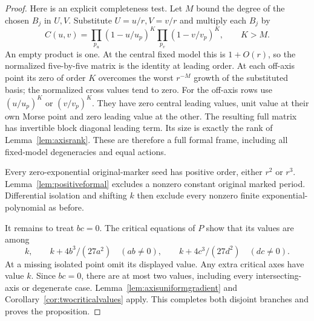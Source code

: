 \documentclass[11pt]{article}
\theoremstyle{definition}\newtheorem{definition}[theorem]{Definition}
\theoremstyle{remark}\newtheorem{remark}[theorem]{Remark}
\begin{document}
\begin{proof}
Here is an explicit completeness test. Let $M$ bound the degree
of the chosen $B_j$ in $U,V$. Substitute $U=u/r,V=v/r$ and
multiply each $B_j$ by
\[
 C(u,v)=\prod_{p_u}(1-u/u_p)^K
                      \prod_{p_v}(1-v/v_p)^K,\qquad K>M.
\]
An empty product is one. At the central fixed model this is
$1+O(r)$, so the normalized five-by-five matrix is the identity
at leading order. At each off-axis point its zero of order $K$
overcomes the worst $r^{-M}$ growth of the substituted basis;
the normalized cross values tend to zero. For the off-axis rows
use $(u/u_p)^K$ or $(v/v_p)^K$. They have zero central leading
values, unit value at their own Morse point and zero leading
value at the other. The resulting full matrix has invertible
block diagonal leading term. Its size is exactly the rank of
Lemma~\ref{lem:axisrank}. These are therefore a full formal
frame, including all fixed-model degeneracies and equal actions.

Every zero-exponential original-marker seed has positive order,
either $r^2$ or $r^3$. Lemma~\ref{lem:positiveformal} excludes
a nonzero constant original marked period. Differential
isolation and shifting $k$ then exclude every nonzero finite
exponential-polynomial as before.

It remains to treat $bc=0$. The critical equations of $P$ show
that its values are among
\[
 k,\qquad k+4b^3/(27a^2)\quad(ab\ne0),\qquad
 k+4c^3/(27d^2)\quad(dc\ne0).
\]
At a missing isolated point omit its displayed value. Any extra
critical axes have value $k$. Since $bc=0$, there are at most
two values, including every intersecting-axis or degenerate
case. Lemma~\ref{lem:axisuniformgradient} and
Corollary~\ref{cor:twocriticalvalues} apply. This completes both
disjoint branches and proves the proposition.
\end{proof}
\end{document}
